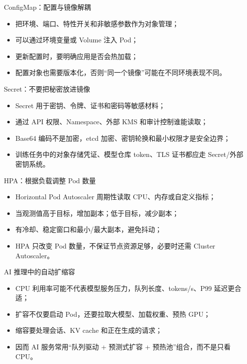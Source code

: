 \documentclass[UTF8,fontset=none,aspectratio=169,10pt]{beamer}
\begin{document}
\begin{frame}{ConfigMap：配置与镜像解耦}
\begin{itemize}
  \item 把环境、端口、特性开关和非敏感参数作为对象管理；
  \item 可以通过环境变量或 Volume 注入 Pod；
  \item 更新配置时，要明确应用是否会热加载；
  \item 配置对象也需要版本化，否则“同一个镜像”可能在不同环境表现不同。
\end{itemize}
\vfill
{}
\end{frame}

\begin{frame}{Secret：不要把秘密放进镜像}
\begin{itemize}
  \item Secret 用于密钥、令牌、证书和密码等敏感材料；
  \item 通过 API 权限、Namespace、外部 KMS 和审计控制谁能读取；
  \item Base64 编码不是加密，etcd 加密、密钥轮换和最小权限才是安全边界；
  \item 训练任务中的对象存储凭证、模型仓库 token、TLS 证书都应走 Secret/外部密钥系统。
\end{itemize}
\end{frame}

\begin{frame}{HPA：根据负载调整 Pod 数量}
\begin{itemize}
  \item Horizontal Pod Autoscaler 周期性读取 CPU、内存或自定义指标；
  \item 当观测值高于目标，增加副本；低于目标，减少副本；
  \item 有冷却、稳定窗口和最小/最大副本，避免抖动；
  \item HPA 只改变 Pod 数量，不保证节点资源足够，必要时还需 Cluster Autoscaler。
\end{itemize}
\vfill
{}
\end{frame}

\begin{frame}{AI 推理中的自动扩缩容}
\begin{itemize}
  \item CPU 利用率可能不代表模型服务压力，队列长度、tokens/s、P99 延迟更合适；
  \item 扩容不仅要启动 Pod，还要拉取大模型、加载权重、预热 GPU；
  \item 缩容要处理会话、KV cache 和正在生成的请求；
  \item 因而 AI 服务常用“队列驱动 + 预测式扩容 + 预热池”组合，而不是只看 CPU。
\end{itemize}
\end{frame}
\end{document}

